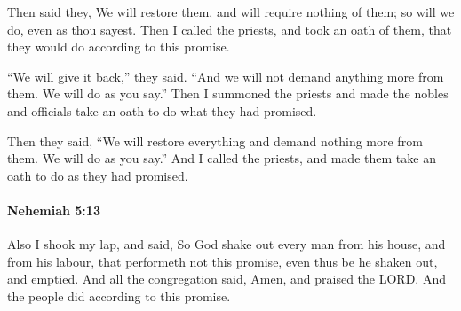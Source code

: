 			\begin{versebox}
					\item[BHS] 
					\item[LXX] 
					\item[ASV] Then said they, We will restore them, and will require nothing of them; so will we do, even as thou sayest. Then I called the priests, and took an oath of them, that they would do according to this promise.
					\item[NIV] “We will give it back,” they said. “And we will not demand anything more from them. We will do as you say.” Then I summoned the priests and made the nobles and officials take an oath to do what they had promised.
					\item[NRSV] Then they said, “We will restore everything and demand nothing more from them. We will do as you say.” And I called the priests, and made them take an oath to do as they had promised.
			\end{versebox}

		\paragraph{Nehemiah 5:13} %
			\label{NEHEMIAH-5-13}

			Also I shook my lap, and said, So God shake out every man from his house, and from his labour, that performeth not this promise, even thus be he shaken out, and emptied. And all the congregation said, Amen, and praised the LORD. And the people did according to this promise.


